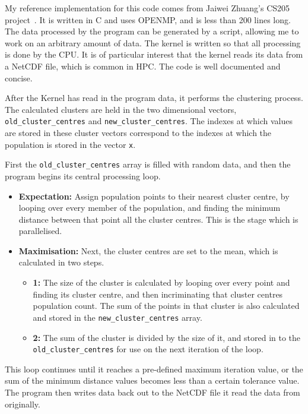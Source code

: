 My reference implementation for this code comes from Jaiwei Zhuang's CS205 project~\cite{CS205}. It is written in C and uses OPENMP, and is less than 200 lines long. The data processed by the program can be generated by a script, allowing me to work on an arbitrary amount of data. The kernel is written so that all processing is done by the CPU\@. It is of particular interest that the kernel reads its data from a NetCDF file, which is common in HPC\@. The code is well documented and concise.

After the Kernel has read in the program data, it performs the clustering process. The calculated clusters are held in the two dimensional vectors, \texttt{old\_cluster\_centres} and \texttt{new\_cluster\_centres}. The indexes at which values are stored in these cluster vectors correspond to the indexes at which the population is stored in the vector \texttt{x}.

First the \texttt{old\_cluster\_centres} array is filled with random data, and then the program begins its central processing loop.

\begin{itemize}
  \item \textbf{Expectation:} Assign population points to their nearest cluster centre, by looping over every member of the population, and finding the minimum distance between that point all the cluster centres. This is the stage which is parallelised.
  \item \textbf{Maximisation:} Next, the cluster centres are set to the mean, which is calculated in two steps.
  \begin{itemize}
    \item \textbf{1:} The size of the cluster is calculated by looping over every point and finding its cluster centre, and then incriminating that cluster centres population count. The sum of the points in that cluster is also calculated and stored in the \texttt{new\_cluster\_centres} array.
   \item \textbf{2:} The sum of the cluster is divided by the size of it, and stored in to the \texttt{old\_cluster\_centres} for use on the next iteration of the loop.
   \end{itemize}
\end{itemize}
This loop continues until it reaches a pre-defined maximum iteration value, or the sum of the minimum distance values becomes less than a certain tolerance value. The program then writes data back out to the NetCDF file it read the data from originally.

